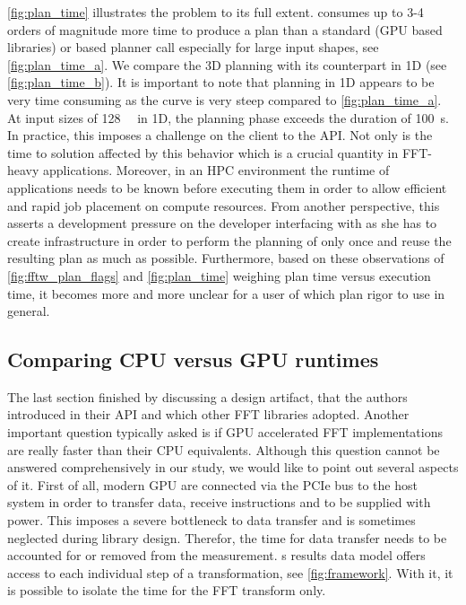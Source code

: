 \cref{fig:plan_time} illustrates the problem to its full extent.  consumes up to 3-4 orders of magnitude more time to produce a plan than a standard (GPU based libraries) or  based planner call especially for large input shapes, see \cref{fig:plan_time_a}. We compare the 3D planning with its counterpart in 1D (see \cref{fig:plan_time_b}). It is important to note that \fftw{} planning in 1D appears to be very time consuming as the  curve is very steep compared to \cref{fig:plan_time_a}. At input sizes of \SI{128}{\mebi\byte} in 1D, the planning phase exceeds the duration of \SI{100}{\second}. In practice, this imposes a challenge on the client to the \fftw{} API. Not only is the time to solution affected by this behavior which is a crucial quantity in FFT-heavy applications. Moreover, in an HPC environment the runtime of applications needs to be known before executing them in order to allow efficient and rapid job placement on compute resources. From another perspective, this asserts a development pressure on the developer interfacing with \fftw{} as she has to create infrastructure in order to perform the planning of \fftw{} only once and reuse the resulting plan as much as possible. Furthermore, based on these observations of \cref{fig:fftw_plan_flags} and \cref{fig:plan_time} weighing plan time versus execution time, it becomes more and more unclear for a user of \fftw{} which plan rigor to use in general.

\subsection{Comparing CPU versus GPU runtimes}
\label{ssec:cpu_vs_gpu}

The last section finished by discussing a design artifact, that the \fftw{} authors introduced in their API and which other FFT libraries adopted. Another important question typically asked is if GPU accelerated FFT implementations are really faster than their CPU equivalents. Although this question cannot be answered comprehensively in our study, we would like to point out several aspects of it. First of all, modern GPU are connected via the PCIe bus to the host system in order to transfer data, receive instructions and to be supplied with power. This imposes a severe bottleneck to data transfer and is sometimes neglected during library design. Therefor, the time for data transfer needs to be accounted for or removed from the measurement. \gearshifft{}s results data model offers access to each individual step of a transformation, see \cref{fig:framework}. With it, it is possible to isolate the time for the FFT transform only.

